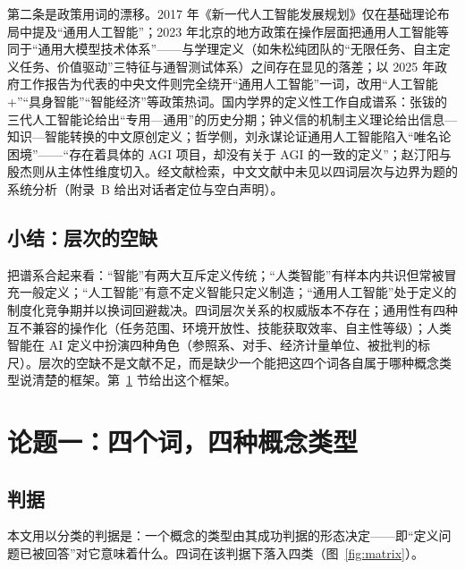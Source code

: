 \documentclass[10pt,fontset=fandol]{ctexart}
\begin{document}
第二条是政策用词的漂移。2017 年《新一代人工智能发展规划》仅在基础理论布局中提及“通用人工智能”\cite{state2017plan}；2023 年北京的地方政策在操作层面把通用人工智能等同于“通用大模型技术体系”\cite{beijing2023measures}——与学理定义（如朱松纯团队的“无限任务、自主定义任务、价值驱动”三特征与通智测试体系\cite{zhu2025tongtest}）之间存在显见的落差；以 2025 年政府工作报告为代表的中央文件则完全绕开“通用人工智能”一词，改用“人工智能+”“具身智能”“智能经济”等政策热词\cite{gov2025report}。国内学界的定义性工作自成谱系：张钹的三代人工智能论给出“专用—通用”的历史分期\cite{zhang2020third}；钟义信的机制主义理论给出信息—知识—智能转换的中文原创定义\cite{zhong2018mechanism}；哲学侧，刘永谋论证通用人工智能陷入“唯名论困境”——“存在着具体的 AGI 项目，却没有关于 AGI 的一致的定义”\cite{liu2024complex}；赵汀阳与殷杰则从主体性维度切入\cite{zhao2019selfconscious}。经文献检索，中文文献中未见以四词层次与边界为题的系统分析（附录~B 给出对话者定位与空白声明）。

\subsection{小结：层次的空缺}

把谱系合起来看：“智能”有两大互斥定义传统；“人类智能”有样本内共识但常被冒充一般定义；“人工智能”有意不定义智能只定义制造；“通用人工智能”处于定义的制度化竞争期并以换词回避裁决。四词层次关系的权威版本不存在；通用性有四种互不兼容的操作化（任务范围、环境开放性、技能获取效率、自主性等级）；人类智能在 AI 定义中扮演四种角色（参照系、对手、经济计量单位、被批判的标尺）。层次的空缺不是文献不足，而是缺少一个能把这四个词各自属于哪种概念类型说清楚的框架。第~\ref{sec:types} 节给出这个框架。

\section{论题一：四个词，四种概念类型}\label{sec:types}

\subsection{判据}

本文用以分类的判据是：一个概念的类型由其成功判据的形态决定——即“定义问题已被回答”对它意味着什么。四词在该判据下落入四类（图~\ref{fig:matrix}）。
\end{document}
